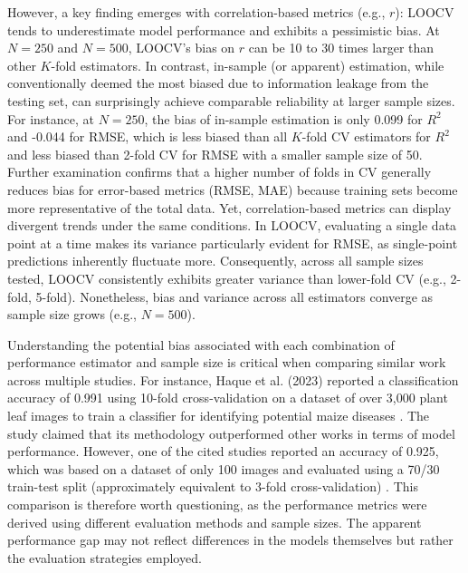 However, a key finding emerges with correlation-based metrics (e.g., $r$): LOOCV tends to underestimate model performance and exhibits a pessimistic bias. At $N=250$ and $N=500$, LOOCV’s bias on $r$ can be 10 to 30 times larger than other $K$-fold estimators. In contrast, in-sample (or apparent) estimation, while conventionally deemed the most biased due to information leakage from the testing set, can surprisingly achieve comparable reliability at larger sample sizes. For instance, at $N=250$, the bias of in-sample estimation is only 0.099 for $R^2$ and -0.044 for RMSE, which is less biased than all $K$-fold CV estimators for $R^2$ and less biased than 2-fold CV for RMSE with a smaller sample size of 50. Further examination confirms that a higher number of folds in CV generally reduces bias for error-based metrics (RMSE, MAE) because training sets become more representative of the total data. Yet, correlation-based metrics can display divergent trends under the same conditions. In LOOCV, evaluating a single data point at a time makes its variance particularly evident for RMSE, as single-point predictions inherently fluctuate more. Consequently, across all sample sizes tested, LOOCV consistently exhibits greater variance than lower-fold CV (e.g., 2-fold, 5-fold). Nonetheless, bias and variance across all estimators converge as sample size grows (e.g., $N=500$).

Understanding the potential bias associated with each combination of performance estimator and sample size is critical when comparing similar work across multiple studies. For instance, Haque et al. (2023) reported a classification accuracy of 0.991 using 10-fold cross-validation on a dataset of over 3,000 plant leaf images to train a classifier for identifying potential maize diseases \citep{haque_recognition_2023}. The study claimed that its methodology outperformed other works in terms of model performance. However, one of the cited studies reported an accuracy of 0.925, which was based on a dataset of only 100 images and evaluated using a 70/30 train-test split (approximately equivalent to 3-fold cross-validation) \citep{sibiya_computational_2019}. This comparison is therefore worth questioning, as the performance metrics were derived using different evaluation methods and sample sizes. The apparent performance gap may not reflect differences in the models themselves but rather the evaluation strategies employed.

